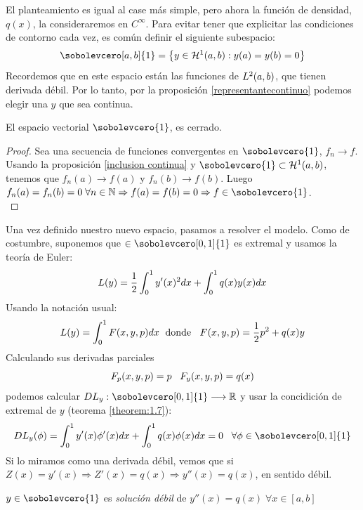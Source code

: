 El planteamiento es igual al case más simple, pero ahora la función de densidad, $q(x)$, la consideraremos en $C^\infty$. Para evitar tener que explicitar las condiciones de contorno cada vez, es común definir el siguiente subespacio:
\[
\sobolevcero[a,b]{1}=\conjunto{y\in\sobolev{1}: y(a)=y(b)=0}
\]
Recordemos que en este espacio están las funciones de $L^{ 2 }(a,b)$, que tienen derivada débil. Por lo tanto, por la proposición \ref{representantecontinuo} podemos elegir una $y$ que sea continua.
\begin{prop}
El espacio vectorial $\sobolevcero{1}$, es cerrado.
\end{prop}   
\begin{proof}
Sea una secuencia de funciones convergentes en $\sobolevcero{1}$, $f_n\longrightarrow f$. Usando la proposición \ref{inclusion continua} y $\sobolevcero{1}\subset\sobolev{1}$, tenemos que $f_n(a)\longrightarrow f(a)$ y $f_n(b)\longrightarrow f(b)$. Luego $f_n(a)=f_n(b)=0 \;\forall n\in\N \Rightarrow f(a)=f(b)=0 \Rightarrow f\in\sobolevcero{1}$.\\
\end{proof}

Una vez definido nuestro nuevo espacio, pasamos a resolver el modelo. Como de costumbre, suponemos que $\in\sobolevcero[0,1]{1}$ es extremal y usamos la teoría de Euler:
\[
L(y)=\frac{1}{2}\displaystyle\int_{ 0 }^{ 1 } y'(x)^2dx+\displaystyle\int_{ 0 }^{ 1 } q(x)y(x)dx
\]
Usando la notación usual:
\[
L(y)=\displaystyle\int_{ 0 }^{ 1 } F(x,y,p)dx \; \text{ donde } \;\; F(x,y,p)=\frac{1}{2}p^2+q(x)y
\]
Calculando sus derivadas parciales
\[
F_p(x,y,p)=p \;\;\; F_y(x,y,p)=q(x)
\]
podemos calcular $\funcion{DL_y}{\sobolevcero[0,1]{1}}{\R}$ y usar la concidición de extremal de $y$ (teorema \ref{theorem:1.7}):
\[
DL_y(\phi)=\integral{0}{1}{y'(x)\phi'(x)dx}+\integral{0}{1}{q(x)\phi(x)dx}=0 \espacio \forall \phi\in\sobolevcero[0,1]{1}
\]
Si lo miramos como una derivada débil, vemos que si $Z(x)=y'(x) \Rightarrow Z'(x)=q(x) \Rightarrow y''(x)=q(x)$, en sentido débil.
\begin{definition}
$y\in\sobolevcero{1}$ es \textit{solución débil} de $y''(x)=q(x) \; \forall x \in [a,b]$
\end{definition}